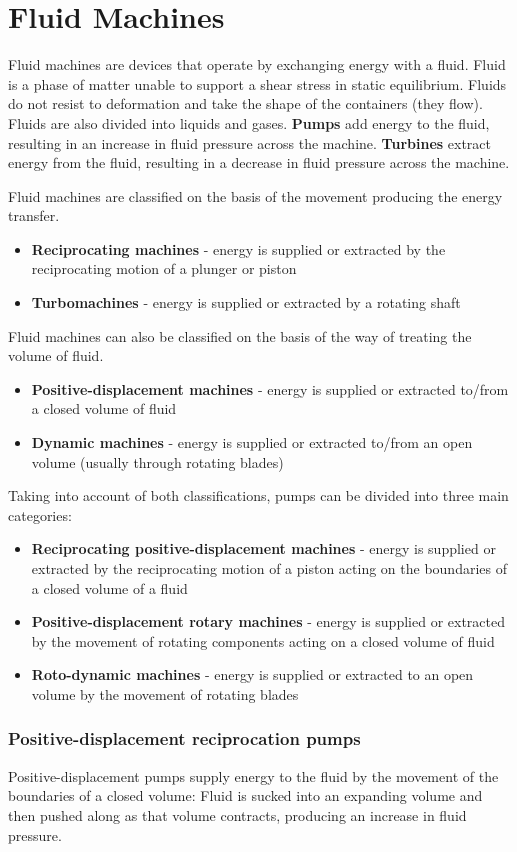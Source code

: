 \documentclass[class=report, crop=false, 12pt,a4paper]{standalone}
\begin{document}
\section{Fluid Machines}
Fluid machines are devices that operate by exchanging energy with a fluid. Fluid is a phase of matter unable to support a shear stress in static equilibrium. Fluids do not resist to deformation and take the shape of the containers (they flow). Fluids are also divided into liquids and gases. \textbf{Pumps} add energy to the fluid, resulting in an increase in fluid pressure across the machine. \textbf{Turbines} extract energy from the fluid, resulting in a decrease in fluid pressure across the machine.

Fluid machines are classified on the basis of the movement producing the energy transfer.
\begin{itemize}
  \item \textbf{Reciprocating machines} - energy is supplied or extracted by the reciprocating motion of a plunger or piston
  \item \textbf{Turbomachines} - energy is supplied or extracted by a rotating shaft
\end{itemize}
Fluid machines can also be classified on the basis of the way of treating the volume of fluid.
\begin{itemize}
  \item \textbf{Positive-displacement machines} - energy is supplied or extracted to/from a closed volume of fluid
  \item \textbf{Dynamic machines} - energy is supplied or extracted to/from an open volume (usually through rotating blades)
\end{itemize}
Taking into account of both classifications, pumps can be divided into three main categories:
\begin{itemize}
  \item \textbf{Reciprocating positive-displacement machines} - energy is supplied or extracted by the reciprocating motion of a piston acting on the boundaries of a closed volume of a fluid
  \item \textbf{Positive-displacement rotary machines} - energy is supplied or extracted by the movement of rotating components acting on a closed volume of fluid
  \item \textbf{Roto-dynamic machines} - energy is supplied or extracted to an open volume by the movement of rotating blades
\end{itemize}
\subsubsection*{Positive-displacement reciprocation pumps}
Positive-displacement pumps supply energy to the fluid by the movement of the boundaries of a closed volume: Fluid is sucked into an expanding volume and then pushed along as that volume contracts, producing an increase in fluid pressure.
\end{document}
